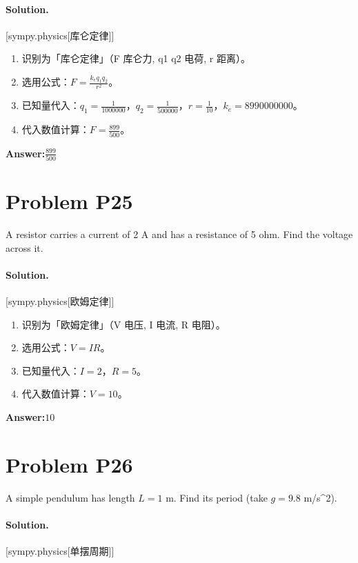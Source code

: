 \documentclass[11pt,a4paper]{ctexart}
\newcommand{\solvertag}[1]{{\footnotesize\color{gray}\textsf{[#1]}}}
\begin{document}
\paragraph{Solution.} \solvertag{sympy.physics[库仑定律]} 

\begin{enumerate}[leftmargin=*]
  \item 识别为「库仑定律」（F 库仑力, q1 q2 电荷, r 距离）。
  \item 选用公式：$F = \frac{k_{e} q_{1} q_{2}}{r^{2}}$。
  \item 已知量代入：$q_{1} = \frac{1}{1000000}$，$q_{2} = \frac{1}{500000}$，$r = \frac{1}{10}$，$k_{e} = 8990000000$。
  \item 代入数值计算：$ F = \frac{899}{500} $。
\end{enumerate}

\noindent\textbf{Answer:}\quad $\frac{899}{500}$

\medskip

\section*{Problem P25}
A resistor carries a current of 2 A and has a resistance of 5 ohm. Find the voltage across it.

\paragraph{Solution.} \solvertag{sympy.physics[欧姆定律]} 

\begin{enumerate}[leftmargin=*]
  \item 识别为「欧姆定律」（V 电压, I 电流, R 电阻）。
  \item 选用公式：$V = I R$。
  \item 已知量代入：$I = 2$，$R = 5$。
  \item 代入数值计算：$ V = 10 $。
\end{enumerate}

\noindent\textbf{Answer:}\quad $10$

\medskip

\section*{Problem P26}
A simple pendulum has length $L = 1$ m. Find its period (take $g = 9.8$ m/s\textasciicircum{}2).

\paragraph{Solution.} \solvertag{sympy.physics[单摆周期]} 
\end{document}

